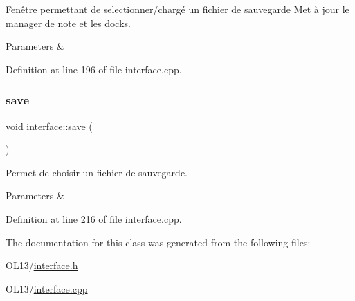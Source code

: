 Fenêtre permettant de selectionner/chargé un fichier de sauvegarde Met à jour le manager de note et les docks. 


\begin{DoxyParams}{Parameters}
{\em } & \\
\hline
\end{DoxyParams}


Definition at line 196 of file interface.\+cpp.

\mbox{\label{classinterface_a319f133949e2be97a203f725c3f1e565}} 
\subsubsection{\texorpdfstring{save}{save}}
{\footnotesize\ttfamily void interface\+::save (\begin{DoxyParamCaption}{ }\end{DoxyParamCaption})\hspace{0.3cm}{\ttfamily [slot]}}



Permet de choisir un fichier de sauvegarde. 


\begin{DoxyParams}{Parameters}
{\em } & \\
\hline
\end{DoxyParams}


Definition at line 216 of file interface.\+cpp.



The documentation for this class was generated from the following files\+:\begin{DoxyCompactItemize}
\item 
O\+L13/\hyperlink{interface_8h}{interface.\+h}\item 
O\+L13/\hyperlink{interface_8cpp}{interface.\+cpp}\end{DoxyCompactItemize}
